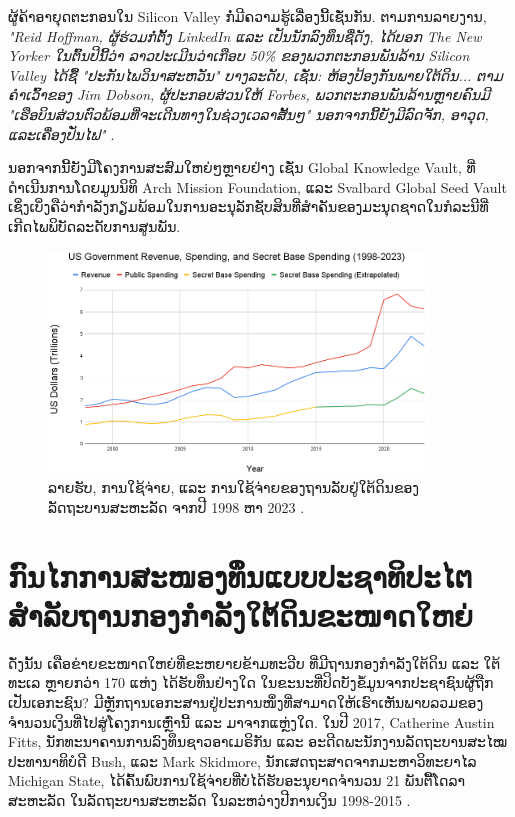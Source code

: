 \documentclass[10pt,twocolumn,letterpaper]{article}
\begin{document}
ຜູ້ຄ້າອາຍຸດຕະກອນໃນ Silicon Valley ກໍ່ມີຄວາມຮູ້ເລື່ອງນີ້ເຊັ່ນກັນ. ຕາມການລາຍງານ, \textit{"Reid Hoffman, ຜູ້ຮ່ວມກໍ່ຕັ້ງ LinkedIn ແລະ ເປັນນັກລົງທຶນຊື່ດັງ, ໄດ້ບອກ The New Yorker ໃນຕົ້ນປີນີ້ວ່າ ລາວປະເມີນວ່າເກືອບ 50\% ຂອງພວກຕະກອນພັນລ້ານ Silicon Valley ໄດ້ຊື້ "ປະກັນໄພວິນາສະຫວັນ" ບາງລະດັບ, ເຊັ່ນ: ຫ້ອງປ້ອງກັນພາຍໃຕ້ດິນ... ຕາມຄຳເວົ້າຂອງ Jim Dobson, ຜູ້ປະກອບສ່ວນໃຫ້ Forbes, ພວກຕະກອນພັນລ້ານຫຼາຍຄົນມີ "ເຮືອບິນສ່ວນຕົວພ້ອມທີ່ຈະເດີນທາງໃນຊ່ວງເວລາສັ້ນໆ" ນອກຈາກນີ້ຍັງມີລົດຈັກ, ອາວຸດ, ແລະເຄື່ອງປັ່ນໄຟ"} \cite{28}.

ນອກຈາກນີ້ຍັງມີໂຄງການສະສົມໃຫຍ່ໆຫຼາຍຢ່າງ ເຊັ່ນ Global Knowledge Vault, ທີ່ດຳເນີນການໂດຍມູນນິທິ Arch Mission Foundation, \cite{29} ແລະ Svalbard Global Seed Vault \cite{30} ເຊິ່ງເບິ່ງຄືວ່າກຳລັງກຽມພ້ອມໃນການອະນຸລັກຊັບສິນທີ່ສຳຄັນຂອງມະນຸດຊາດໃນກໍລະນີທີ່ເກີດໄພພິບັດລະດັບການສູນພັນ.
\begin{figure}[t]
\begin{center}
\includegraphics[width=0.9\textwidth]{govcrop2.png}
\end{center}
   \caption{ລາຍຮັບ, ການໃຊ້ຈ່າຍ, ແລະ ການໃຊ້ຈ່າຍຂອງຖານລັບຢູ່ໃຕ້ດິນຂອງລັດຖະບານສະຫະລັດ ຈາກປີ 1998 ຫາ 2023 \cite{19}.}
   \label{fig:9}
\end{figure}
\section{ກົນໄກການສະໜອງທຶນແບບປະຊາທິປະໄຕສຳລັບຖານກອງກຳລັງໃຕ້ດິນຂະໜາດໃຫຍ່}

ດັ່ງນັ້ນ ເຄືອຂ່າຍຂະໜາດໃຫຍ່ທີ່ຂະຫຍາຍຂ້າມທະວີບ ທີ່ມີຖານກອງກຳລັງໃຕ້ດິນ ແລະ ໃຕ້ທະເລ ຫຼາຍກວ່າ 170 ແຫ່ງ ໄດ້ຮັບທຶນຢ່າງໃດ ໃນຂະນະທີ່ປິດບັງຂໍ້ມູນຈາກປະຊາຊົນຜູ້ຖືກເປັນເອກະຊົນ? ມີຫຼັກຖານເອກະສານຢູ່ປະການໜຶ່ງທີ່ສາມາດໃຫ້ເຮົາເຫັນພາບລວມຂອງຈຳນວນເງິນທີ່ໄປສູ່ໂຄງການເຫຼົ່ານີ້ ແລະ ມາຈາກແຫຼ່ງໃດ. ໃນປີ 2017, Catherine Austin Fitts, ນັກທະນາຄານການລົງທຶນຊາວອາເມຣິກັນ ແລະ ອະດີດພະນັກງານລັດຖະບານສະໄໝປະທານາທິບໍດີ Bush, ແລະ Mark Skidmore, ນັກເສດຖະສາດຈາກມະຫາວິທະຍາໄລ Michigan State, ໄດ້ຄົ້ນພົບການໃຊ້ຈ່າຍທີ່ບໍ່ໄດ້ຮັບອະນຸຍາດຈຳນວນ 21 ພັນຕື້ໂດລາສະຫະລັດ ໃນລັດຖະບານສະຫະລັດ ໃນລະຫວ່າງປີການເງິນ 1998-2015 \cite{11,12,13}.
\end{document}
